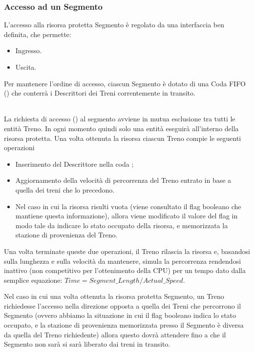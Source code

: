 		\subsubsection{Accesso ad un Segmento}
		
		L'accesso alla risorsa protetta Segmento è regolato da una interfaccia ben definita, che permette:
			\begin{itemize}
				\item Ingresso.
				\item Uscita.
			\end{itemize}
		Per mantenere l'ordine di accesso, ciascun Segmento è dotato di una Coda FIFO () che conterrà i Descrittori dei Treni correntemente in transito.
		
		\begin{description}
			
			\item {} \\
			
			La richiesta di accesso () al segmento avviene in mutua esclusione tra tutti le entità Treno. In ogni momento quindi solo una entità eseguirà all'interno della risorsa protetta. Una volta ottenuta la risorsa ciascun Treno compie le seguenti operazioni
			 \begin{itemize}
			 	\item Inserimento del Descrittore nella coda ;
			 	\item Aggiornamento della velocità di percorrenza del Treno entrato in base a quella dei treni che lo precedono.
			 	\item Nel caso in cui la risorsa risulti vuota (viene consultato il flag booleano che mantiene questa informazione), allora viene modificato il valore del flag in modo tale da indicare lo stato occupato della risorsa, e memorizzata la stazione di provenienza del Treno.
			\end{itemize}
			Una volta terminate queste due operazioni, il Treno rilascia la risorsa e, basandosi sulla lunghezza e sulla velocità da mantenere, simula la percorrenza rendendosi inattivo (non competitivo per l'ottenimento della CPU) per un tempo dato dalla semplice equazione: $ Time = Segment\_Length / Actual\_Speed $.
			
			Nel caso in cui una volta ottenuta la risorsa protetta Segmento, un Treno richiedesse l'accesso nella direzione opposta a quella dei Treni che percorrono il Segmento (ovvero abbiamo la situazione in cui il flag booleano indica lo stato occupato, e la stazione di provenienza memorizzata presso il Segmento è diversa da quella del Treno richiedente) allora questo dovrà attendere fino a che il Segmento non sarà si sarà liberato dai treni in transito.
			

\end{description}
